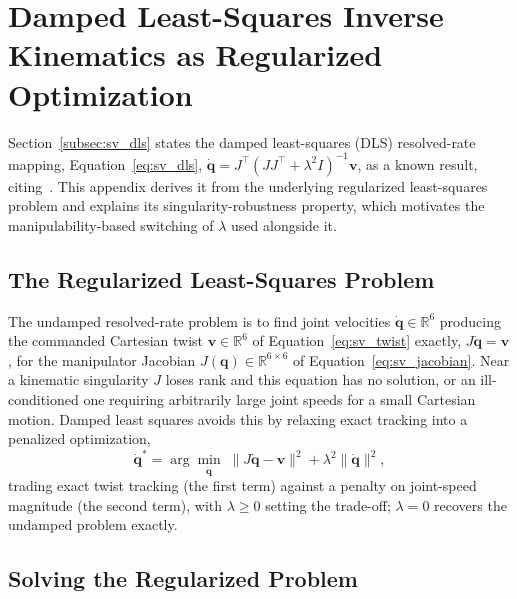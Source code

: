 \chapter{Damped Least-Squares Inverse Kinematics as Regularized Optimization}
\label{app:dls}

Section~\ref{subsec:sv_dls} states the damped least-squares (DLS) resolved-rate mapping,
Equation~\eqref{eq:sv_dls}, $\dot{\mathbf{q}} = J^\top(JJ^\top+\lambda^2I)^{-1}\mathbf{v}$, as a
known result, citing~\citep{whitney1969resolved,wampler1986manipulator,chiaverini1994review,
nakamura1986inverse}. This appendix derives it from the underlying regularized least-squares
problem and explains its singularity-robustness property, which motivates the manipulability-based
switching of $\lambda$ used alongside it.

\section{The Regularized Least-Squares Problem}\label{sec:appD_problem}

The undamped resolved-rate problem is to find joint velocities $\dot{\mathbf{q}} \in \mathbb{R}^6$
producing the commanded Cartesian twist $\mathbf{v} \in \mathbb{R}^6$ of Equation~\eqref{eq:sv_twist}
exactly, $J\dot{\mathbf{q}} = \mathbf{v}$, for the manipulator Jacobian $J(\mathbf{q}) \in
\mathbb{R}^{6\times6}$ of Equation~\eqref{eq:sv_jacobian}. Near a kinematic singularity $J$ loses
rank and this equation has no solution, or an ill-conditioned one requiring arbitrarily large joint
speeds for a small Cartesian motion. Damped least squares avoids this by relaxing exact tracking into
a penalized optimization,
\begin{equation}
\dot{\mathbf{q}}^* = \arg\min_{\dot{\mathbf{q}}} \; \lVert J\dot{\mathbf{q}} - \mathbf{v} \rVert^2
+ \lambda^2 \lVert \dot{\mathbf{q}} \rVert^2,
\label{eq:appD_objective}
\end{equation}
trading exact twist tracking (the first term) against a penalty on joint-speed magnitude (the second
term), with $\lambda \geq 0$ setting the trade-off; $\lambda=0$ recovers the undamped problem exactly.

\section{Solving the Regularized Problem}\label{sec:appD_solve}

